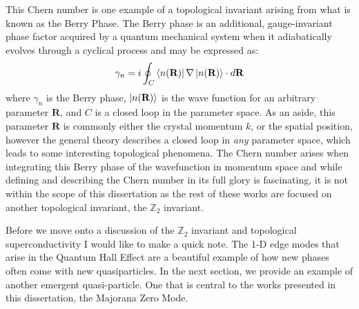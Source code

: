 This Chern number is one example of a topological invariant arising from what is known as the Berry Phase\cite{Berry1984}. The Berry phase is an additional, gauge-invariant phase factor acquired by a quantum mechanical system when it adiabatically evolves through a cyclical process and may be expressed as\cite{Berry1984, Xiao2010}:
\begin{align}
	\gamma_{n} = i\oint_{C}\bra{n(\textbf{R})}\nabla\ket{n(\textbf{R})}\cdot d\textbf{R}
\end{align}
where $\gamma_{n}$ is the Berry phase, $\ket{n(\textbf{R})}$ is the wave function for an arbitrary parameter $\textbf{R}$, and $C$ is a closed loop in the parameter space. As an aside, this parameter $\textbf{R}$ is commonly either the crystal momentum $k$, or the spatial position, however the general theory describes a closed loop in \textit{any} parameter space, which leads to some interesting topological phenomena\cite{Onoda2002,Gobel2019}. The Chern number arises when integrating this Berry phase of the wavefunction in momentum space and while defining and describing the Chern number in its full glory is fascinating, it is not within the scope of this dissertation as the rest of these works are focused on another topological invariant, the $\mathbb{Z}_{2}$ invariant.\par 
Before we move onto a discussion of the $\mathbb{Z}_{2}$ invariant and topological superconductivity I would like to make a quick note. The 1-D edge modes that arise in the Quantum Hall Effect are a beautiful example of how new phases often come with new quasiparticles. In the next section, we provide an example of another emergent quasi-particle. One that is central to the works presented in this dissertation, the Majorana Zero Mode.
